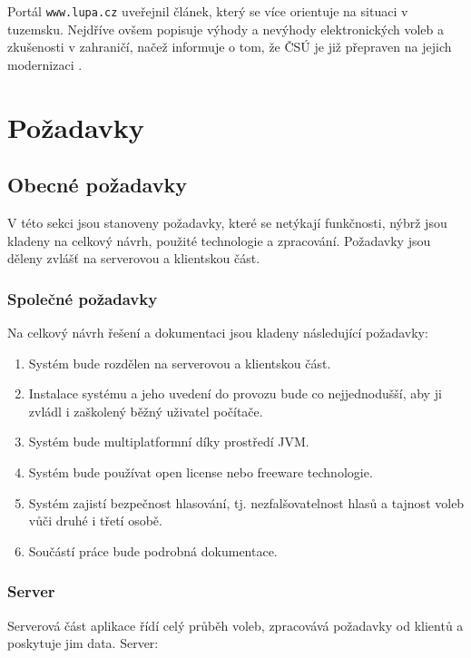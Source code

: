 \documentclass[11pt,twoside,a4paper]{book}
\begin{document}
Portál \texttt{www.lupa.cz} \cite{www:lupa} uveřejnil článek, který se více orientuje na situaci v tuzemsku. Nejdříve ovšem popisuje výhody a nevýhody elektronických voleb a zkušenosti v zahraničí, načež informuje o tom, že ČSÚ je již přepraven na jejich modernizaci \cite{www:csu}. 

\section{Požadavky}

\subsection{Obecné požadavky}

V této sekci jsou stanoveny požadavky, které se netýkají funkčnosti, nýbrž jsou kladeny na celkový návrh, použité technologie a zpracování. Požadavky jsou děleny zvlášť na serverovou a klientskou část.

\subsubsection{Společné požadavky} \label{sec:obecne_pozadavky}

Na celkový návrh řešení a dokumentaci jsou kladeny následující požadavky:

\begin{enumerate}
	\item Systém bude rozdělen na serverovou a klientskou část.
	\item Instalace systému a jeho uvedení do provozu bude co nejjednodušší, aby ji zvládl i zaškolený běžný uživatel počítače.
	\item Systém bude multiplatformní díky prostředí JVM.
	\item Systém bude používat open license nebo freeware technologie.
	\item Systém zajistí bezpečnost hlasování, tj. nezfalšovatelnost hlasů a tajnost voleb vůči druhé i třetí osobě.
	\item Součástí práce bude podrobná dokumentace.
\end{enumerate}

\subsubsection{Server}

Serverová část aplikace řídí celý průběh voleb, zpracovává požadavky od klientů a poskytuje jim data. Server:
\end{document}
